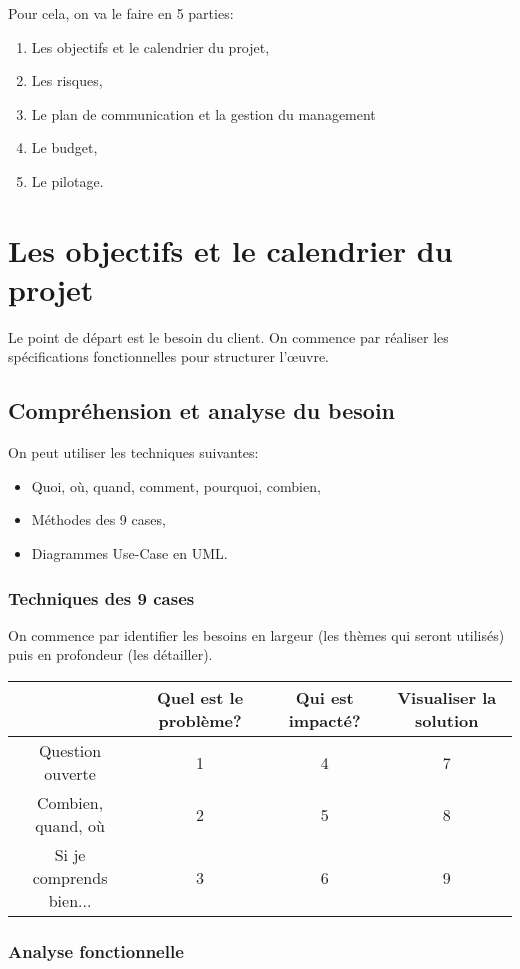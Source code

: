 \documentclass[10pt,a4paper,french]{article}
\begin{document}
Pour cela, on va le faire en 5 parties:
\begin{enumerate}
\item Les objectifs et le calendrier du projet,
\item Les risques,
\item Le plan de communication et la gestion du management
\item Le budget,
\item Le pilotage.
\end{enumerate}

\section{Les objectifs et le calendrier du projet}

Le point de départ est le besoin du client. On commence par réaliser les spécifications fonctionnelles pour structurer l'œuvre.

\subsection{Compréhension et analyse du besoin}

On peut utiliser les techniques suivantes:
\begin{itemize}
\item Quoi, où, quand, comment, pourquoi, combien,
\item Méthodes des 9 cases,
\item Diagrammes Use-Case en UML.
\end{itemize}

\subsubsection{Techniques des 9 cases}

On commence par identifier les besoins en largeur (les thèmes qui seront utilisés) puis en profondeur (les détailler).

\begin{tabular}{c|ccc}
& Quel est le problème? & Qui est impacté? & Visualiser la solution \\
\hline
Question ouverte & 1 & 4 & 7 \\
Combien, quand, où & 2 & 5 & 8 \\
Si je comprends bien... & 3 & 6 & 9 \\
\end{tabular}

\subsubsection{Analyse fonctionnelle}
\end{document}
